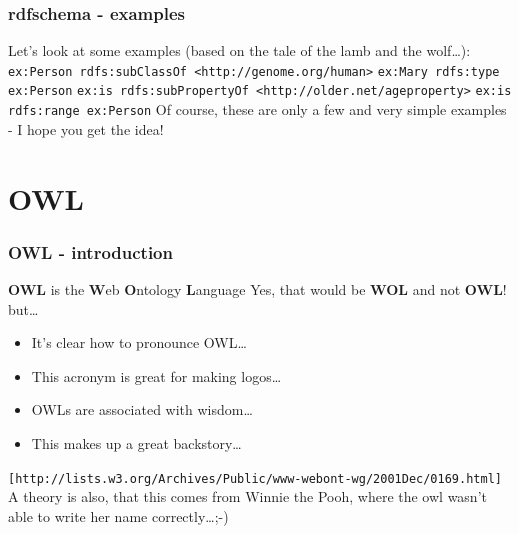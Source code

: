 \documentclass{beamer}
\begin{document}
       \begin{frame}
           \frametitle{rdfschema - examples}

           Let's look at some examples (based on the tale of the lamb and the wolf\ldots):
           \vskip 0.7cm
           \pause
           \texttt{ex:Person    rdfs:subClassOf     <http://genome.org/human>}
           \vskip 0.3cm
           \pause
           \texttt{ex:Mary    rdfs:type     ex:Person}
           \vskip 0.3cm
           \pause
           \texttt{ex:is    rdfs:subPropertyOf    <http://older.net/ageproperty>}
           \vskip 0.3cm
           \pause
           \texttt{ex:is    rdfs:range      ex:Person}
           \vskip 0.7cm
           \pause
           Of course, these are only a few and very simple examples - I hope you get the idea!
       \end{frame}

    \section{OWL}

       \begin{frame}
           \frametitle{OWL - introduction}

           \textbf{OWL} is the \textbf{W}eb \textbf{O}ntology \textbf{L}anguage
           \vskip 0.3cm
           Yes, that would be \textbf{WOL} and not \textbf{OWL}! but\ldots
           \vskip 0.7cm
           \pause
           \begin{itemize}
               \item It's clear how to pronounce OWL\ldots
               \pause
               \item This acronym is great for making logos\ldots
               \pause
               \item OWLs are associated with wisdom\ldots
               \pause
               \item This makes up a great backstory\ldots
               \pause
           \end{itemize}
           \footnotesize  %
           \texttt{[http://lists.w3.org/Archives/Public/www-webont-wg/2001Dec/0169.html]} 
           \normalsize
           \pause
           \vskip 0.7cm
           A theory is also, that this comes from Winnie the Pooh, where the owl wasn't able to
           write her name correctly\ldots ;-)
       \end{frame}
\end{document}
